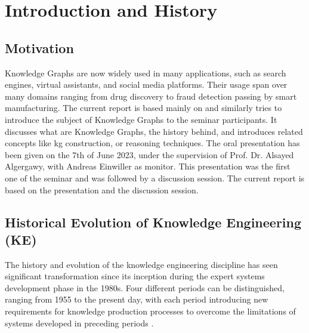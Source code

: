 \documentclass[11pt]{article} %
\begin{document}
\newpage

\tableofcontents
\newpage

\section{Introduction and History}

\subsection{Motivation}
Knowledge Graphs are now widely used in many applications, such as search engines, virtual assistants, and social media platforms. Their usage span over many domains ranging from drug discovery to fraud detection passing by smart manufacturing. The current report is based mainly on  and similarly tries to introduce the subject of Knowledge Graphs to the seminar participants. It discusses what are Knowledge Graphs, the history behind, and introduces related concepts like \acrshort{kg} construction, or reasoning techniques. The oral presentation has been given on the 7th of June 2023, under the supervision of Prof. Dr. Alsayed Algergawy, with Andreas Einwiller as monitor. This presentation was the first one of the seminar and was followed by a discussion session. The current report is based on the presentation and the discussion session.

\subsection{Historical Evolution of Knowledge Engineering (KE)}
The history and evolution of the knowledge engineering discipline has seen significant transformation since its inception during the expert systems development phase in the 1980s. Four different periods can be distinguished, ranging from 1955 to the present day, with each period introducing new requirements for knowledge production processes to overcome the limitations of systems developed in preceding periods \cite*{KGKE22}.
\end{document}
